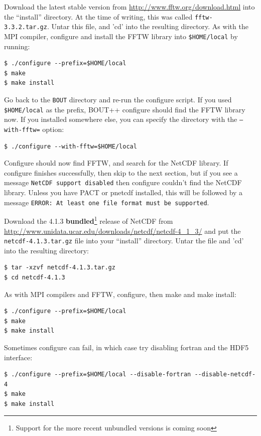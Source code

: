 \documentclass[12pt]{article}
\begin{document}
Download the latest stable version from \url{http://www.fftw.org/download.html} into the ``install'' directory. At the time of writing, this was called
\texttt{fftw-3.3.2.tar.gz}. Untar this file, and 'cd' into the resulting directory. As with the MPI compiler, configure and install the FFTW library into
\texttt{\$HOME/local} by running:
\begin{verbatim}
$ ./configure --prefix=$HOME/local
$ make
$ make install
\end{verbatim}

Go back to the \texttt{BOUT} directory and re-run the configure script.
If you used \texttt{\$HOME/local} as the prefix, BOUT++ configure should
find the FFTW library now. If you installed somewhere else, you can
specify the directory with the \texttt{--with-fftw=} option:
\begin{verbatim}
$ ./configure --with-fftw=$HOME/local
\end{verbatim}

Configure should now find FFTW, and search for the NetCDF library. If
configure finishes successfully, then skip to the next section, but if you
see a message \texttt{NetCDF support disabled} then configure couldn't find
the NetCDF library. Unless you have PACT or pnetcdf installed, this will be
followed by a message \texttt{ERROR: At least one file format must be supported}. 

Download the 4.1.3 {\bf bundled}\footnote{Support for the more recent unbundled versions is coming soon} release of NetCDF from \url{http://www.unidata.ucar.edu/downloads/netcdf/netcdf-4_1_3/} and put the \texttt{netcdf-4.1.3.tar.gz} file into your ``install'' directory. Untar the file and 'cd' into the resulting directory:
\begin{verbatim}
$ tar -xzvf netcdf-4.1.3.tar.gz
$ cd netcdf-4.1.3
\end{verbatim}
As with MPI compilers and FFTW, configure, then make and make install:
\begin{verbatim}
$ ./configure --prefix=$HOME/local
$ make
$ make install
\end{verbatim}
Sometimes configure can fail, in which case try disabling fortran and the
HDF5 interface:
\begin{verbatim}
$ ./configure --prefix=$HOME/local --disable-fortran --disable-netcdf-4
$ make
$ make install
\end{verbatim}

\end{document}
